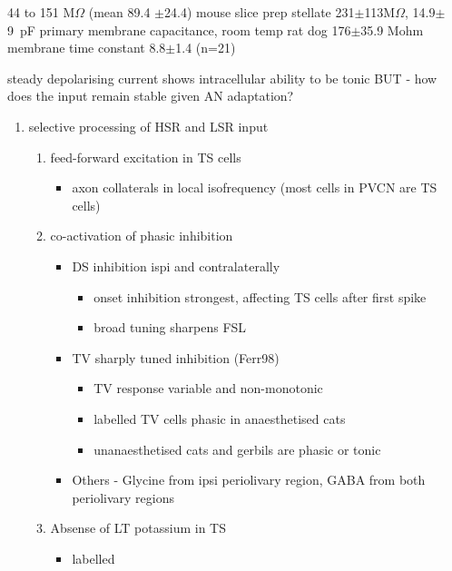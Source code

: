 44 to 151 M$\Omega $ (mean 89.4 {$\pm$}24.4) mouse slice prep \citep{FerragamoGoldingEtAl:1998a}
stellate 
231{$\pm$}113M$\Omega$, 14.9$\pm$9~pF primary membrane capacitance, room temp rat
\citep{IsaacsonWalmsley:1995} dog \citep{BalBaydasEtAl:2009} 
176{$\pm$}35.9 Mohm membrane time constant 8.8{$\pm$}1.4 (n=21)        

steady depolarising current shows intracellular ability to be tonic
\cite{Oertel:1983,OertelWuEtAl:1988} BUT - how does the input remain stable
given AN adaptation?



\begin{enumerate}
\item selective processing of HSR and LSR input
\begin{enumerate}
\item feed-forward excitation in TS cells
\begin{itemize}
\item axon collaterals in local isofrequency (most cells in PVCN are TS cells)
\end{itemize}
\item co-activation of phasic inhibition
\begin{itemize}
\item DS inhibition ispi and contralaterally
\begin{itemize}
\item onset inhibition strongest, affecting TS cells after first spike
\item broad tuning sharpens FSL
\end{itemize}
\item TV sharply tuned inhibition (Ferr98)
\begin{itemize}
\item TV response variable and non-monotonic
\item \citep{Rhode:1999}  labelled TV cells phasic in anaesthetised cats
\item unanaesthetised cats and gerbils are phasic or tonic  \citep{DingVoigt:1997,ShofnerYoung:1985}
\end{itemize}
\item Others - Glycine from ipsi periolivary region, GABA from both
          periolivary regions \citep{AdamsWarr:1976,ShoreHelfertEtAl:1991,OstapoffBensonEtAl:1997}
\end{itemize}
\item Absense of LT potassium in TS
\begin{itemize}
\item labelled \citep{ManisMarx:1991,BalOertel:2001,FerragamoOertel:2002,CaoShatadalEtAl:2007}

\end{itemize}
\end{enumerate}
\end{enumerate}
